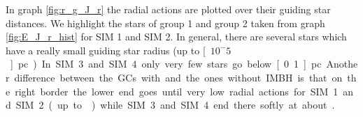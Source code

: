 In graph \ref{fig:r_g_J_r} the radial actions are plotted over their guiding star distances. We highlight the stars of group 1 and group 2 taken from graph \ref{fig:E_J_r_hist} for SIM 1 and SIM 2. In general, there are several stars which have a really small guiding star radius (up to  \unit[\(10^-5\)]{pc}). In SIM 3 and SIM 4 only very few stars go below \unit[0.1]{pc}. Another difference between the \acp{GC} with and the ones without \ac{IMBH} is that on the right border the lower end goes until very low radial actions for SIM 1 and SIM 2 (up to ) while SIM 3 and SIM 4 end there softly at about .


